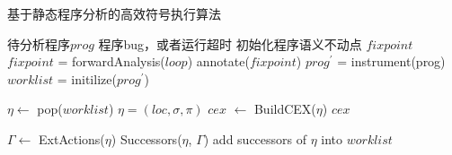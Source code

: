 
\begin{algorithm}[h]
\renewcommand{\algorithmicrequire}{\textbf{Input:}}
\renewcommand{\algorithmicensure}{\textbf{Output:}}
\caption{基于静态程序分析的高效符号执行算法}
\label{algo-absint-symexe}
\begin{algorithmic}[1]
\REQUIRE 待分析程序$prog$
\ENSURE 程序bug，或者运行超时
\STATE 初始化程序语义不动点 $fixpoint$
	\STATE $fixpoint$ = forwardAnalysis($loop$)
	\STATE annotate($fixpoint$)
\ENDFOR
\STATE $prog^{'}$ = instrument(prog)
\STATE $worklist$ = initilize($prog^{'}$)

{}
	\STATE $\eta \gets $ pop($worklist$)
		\STATE $\eta = (loc, \sigma, \pi)$
			\STATE $\mathit{cex}$ $\gets$ BuildCEX($\eta$)
			\RETURN $\mathit{cex}$
		\ENDIF
	
	\ELSE
		\STATE $\Gamma \gets $ ExtActions($\eta$)
		\STATE Successors($\eta$, $\Gamma$)
		\STATE add successors of $\eta$ into $worklist$
	\ENDIF
\ENDWHILE
\end{algorithmic}
\end{algorithm}


%



